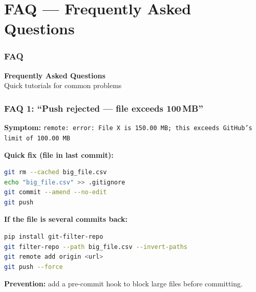 \documentclass{beamer}
\begin{document}
\section{FAQ --- Frequently Asked Questions}

\begin{frame}
\frametitle{FAQ}
\centering
\Large \textbf{Frequently Asked Questions}\\[6pt]
\normalsize Quick tutorials for common problems
\end{frame}

\begin{frame}[fragile]
\frametitle{FAQ 1: ``Push rejected --- file exceeds 100\,MB''}

\textbf{Symptom:} \texttt{remote: error: File X is 150.00 MB; this exceeds GitHub's limit of 100.00 MB}

\textbf{Quick fix (file in last commit):}
\begin{lstlisting}[language=bash]
git rm --cached big_file.csv
echo "big_file.csv" >> .gitignore
git commit --amend --no-edit
git push
\end{lstlisting}

\textbf{If the file is several commits back:}
\begin{lstlisting}[language=bash]
pip install git-filter-repo
git filter-repo --path big_file.csv --invert-paths
git remote add origin <url>
git push --force
\end{lstlisting}

\textbf{Prevention:} add a pre-commit hook to block large files before committing.
\end{frame}
\end{document}

